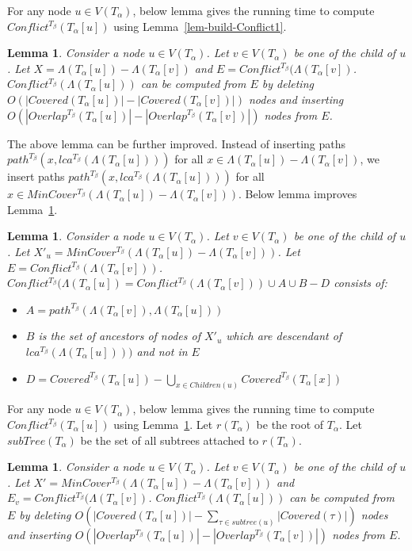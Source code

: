 \documentclass[final,1p,times]{elsarticle}
\newcommand{\TA}{T_\alpha}
\newcommand{\TB}{T_\beta}
\newtheorem{lemma}[theorem]{Lemma}
\begin{document}
    For any node $u \in V(\TA)$, below lemma gives the running time to compute $Conflict^{\TB}(\TA[u])$ using Lemma~\ref{lem-build-Conflict1}.
    \begin{lemma}
	    \label{lem-time-build-Conflict1}
	    Consider a node $u \in V(\TA)$. Let $v \in V(\TA)$ be one of the child of $u$. Let $X=\Lambda(\TA[u])-\Lambda(\TA[v])$ and $E = Conflict^{\TB}(\Lambda(\TA[v])$.
	    $Conflict^{\TB}(\Lambda(\TA[u]))$ can be computed from $E$ by deleting $O(|Covered(\TA[u])| - |Covered(\TA[v])|)$ nodes and inserting $O(|Overlap^{\TB}(\TA[u])| - |Overlap^{\TB}(\TA[v])|)$ nodes from $E$.
    \end{lemma}

    The above lemma can be further improved. Instead of inserting paths $path^{T_{\beta}}(x, lca^{T_{\beta}}(\Lambda(\TA[u])))$ for all $x \in \Lambda(\TA[u]) - \Lambda(\TA[v])$,
    we insert paths $path^{T_{\beta}}(x, lca^{T_{\beta}}(\Lambda(\TA[u])))$ for all $x \in MinCover^{T_{\beta}}(\Lambda(\TA[u]) - \Lambda(\TA[v]))$. Below lemma improves Lemma~\ref{lem-time-build-Conflict1}.

    \begin{lemma}
	    \label{lem-build-Conflict2}
	    Consider a node $u \in V(\TA)$. Let $v \in V(\TA)$ be one of the child of $u$. Let $X'_u=MinCover^{T_{\beta}}(\Lambda(\TA[u])-\Lambda(\TA[v]))$. Let $E=Conflict^{\TB}(\Lambda(\TA[v]))$.
	    $Conflict^{\TB}(\Lambda(\TA[u]) = Conflict^{\TB}(\Lambda(\TA[v])) \cup A \cup B - D$ consists of:
	\begin{itemize}
		\item $A = path^{T_{\beta}}(\Lambda(\TA[v]), \Lambda(\TA[u]))$
		\item $B$ is the set of ancestors of nodes of $X'_u$ which are descendant of $lca^{T_{\beta}}(\Lambda(\TA[u])))$ and not in $E$
		\item $D = Covered^{\TB}(\TA[u]) - \bigcup_{x \in Children(u)} Covered^{\TB}(\TA[x])$
	\end{itemize}
    \end{lemma}

    For any node $u \in V(\TA)$, below lemma gives the running time to compute $Conflict^{\TB}(\TA[u])$ using Lemma~\ref{lem-build-Conflict2}.
    Let $r(T_{\alpha})$ be the root of $T_{\alpha}$. Let $subTree(T_{\alpha})$ be the set of all subtrees attached to $r(T_{\alpha})$.
    \begin{lemma}
	    \label{lem-time-build-Conflict2}
	    Consider a node $u \in V(\TA)$. Let $v \in V(\TA)$ be one of the child of $u$. Let $X'=MinCover^{T_{\beta}}(\Lambda(\TA[u])-\Lambda(\TA[v]))$ and $E_v = Conflict^{\TB}(\Lambda(\TA[v])$.
	    $Conflict^{\TB}(\Lambda(\TA[u]))$ can be computed from $E$ by deleting $O(|Covered(\TA[u])| - \sum_{\tau \in subtree(u)} |Covered(\tau)|)$ nodes and inserting $O(|Overlap^{\TB}(\TA[u])| - |Overlap^{\TB}(\TA[v])|)$ nodes from $E$.
    \end{lemma}
\end{document}
